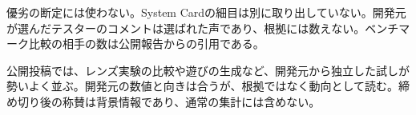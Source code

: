 \begin{claimboundary}[資料と評価の境界]
優劣の断定には使わない。System Cardの細目は別に取り出していない。開発元が選んだテスターのコメントは選ばれた声であり、根拠には数えない。ベンチマーク比較の相手の数は公開報告からの引用である。
\end{claimboundary}

\begin{communitynote}
公開投稿では、レンズ実験の比較\cite{w39x-c2-lens}や遊びの生成\cite{w39x-c2-game}など、開発元から独立した試しが勢いよく並ぶ。開発元の数値と向きは合うが、根拠ではなく動向として読む。締め切り後の称賛は背景情報であり、通常の集計には含めない。
\end{communitynote}
